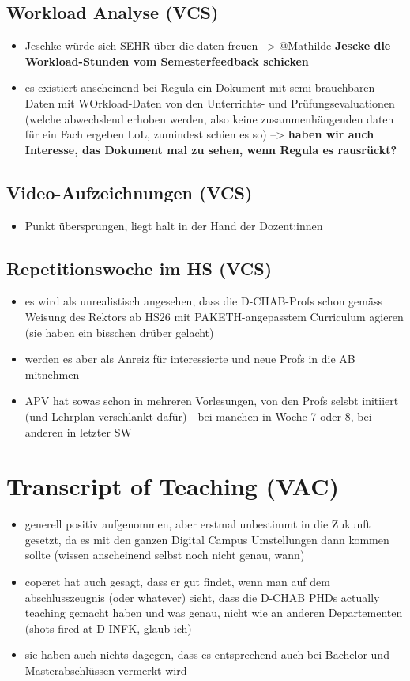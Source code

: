\documentclass{article}
\begin{document}
\subsection{Workload Analyse (VCS)}
\begin{itemize}
    \item Jeschke würde sich SEHR über die daten freuen --> @Mathilde \textbf{Jescke die Workload-Stunden vom Semesterfeedback schicken}
    \item es existiert anscheinend bei Regula ein Dokument mit semi-brauchbaren Daten mit WOrkload-Daten von den Unterrichts- und Prüfungsevaluationen (welche abwechslend erhoben werden, also keine zusammenhängenden daten für ein Fach ergeben LoL, zumindest schien es so) --> \textbf{haben wir auch Interesse, das Dokument mal zu sehen, wenn Regula es rausrückt?}
\end{itemize}

\subsection{Video-Aufzeichnungen (VCS)}
\begin{itemize}
    \item Punkt übersprungen, liegt halt in der Hand der Dozent:innen
\end{itemize}\textbf{}

\subsection{Repetitionswoche im HS (VCS)}
\begin{itemize}
    \item es wird als unrealistisch angesehen, dass die D-CHAB-Profs schon gemäss Weisung des Rektors ab HS26 mit PAKETH-angepasstem Curriculum agieren (sie haben ein bisschen drüber gelacht)
    \item werden es aber als Anreiz für interessierte und neue Profs in die AB mitnehmen
    \item APV hat sowas schon in mehreren Vorlesungen, von den Profs selsbt initiiert (und Lehrplan verschlankt dafür) - bei manchen in Woche 7 oder 8, bei anderen in letzter SW
\end{itemize}

\section{Transcript of Teaching (VAC)}
\begin{itemize}
    \item generell positiv aufgenommen, aber erstmal unbestimmt in die Zukunft gesetzt, da es mit den ganzen Digital Campus Umstellungen dann kommen sollte (wissen anscheinend selbst noch nicht genau, wann)
    \item coperet hat auch gesagt, dass er gut findet, wenn man auf dem abschlusszeugnis (oder whatever) sieht, dass die D-CHAB PHDs actually teaching gemacht haben und was genau, nicht wie an anderen Departementen (shots fired at D-INFK, glaub ich)
    \item sie haben auch nichts dagegen, dass es entsprechend auch bei Bachelor und Masterabschlüssen vermerkt wird
\end{itemize}
\end{document}
